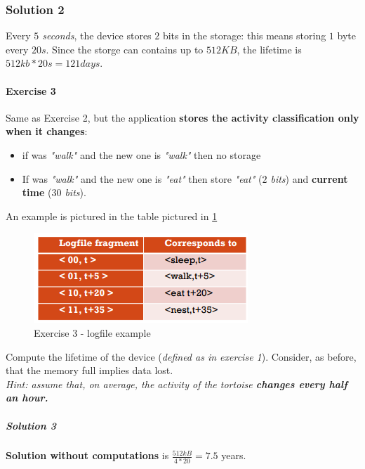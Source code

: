 \documentclass[10pt,a4paper]{report}
\theoremstyle{definition}
\begin{document}
\subsubsection{Solution 2}\label{sec:solution-2}
Every \textit{$5$ seconds}, the device stores $2$ bits in the storage: this means storing $1$ byte every $20s$. Since the storge can contains up to $512 KB$, the lifetime is $512kb*20s = 121 days$.

\paragraph{Exercise 3}\label{sec:exercise-3}
Same as Exercise 2, but the application \textbf{stores the activity classification only when it changes}:
\begin{itemize}
	\item 
	if was \textit{"walk"} and the new one is \textit{"walk"} then no storage
	\item 
	If was \textit{"walk"} and the new one is \textit{"eat"} then store \textit{"eat"} (\textit{$2$ bits}) and \textbf{current time} (\textit{$30$ bits}).
	
\end{itemize}

An example is pictured in the table pictured in \ref{tortoise-eg3}
\begin{figure}[b!]
	\centering\includegraphics[scale=0.50]{images/Pasted image 20230401160622.png}
	\caption{Exercise 3 - logfile example}
	\label{tortoise-eg3}
\end{figure}

Compute the lifetime of the device (\textit{defined as in exercise 1}). Consider, as before, that the memory full implies data lost.\\

\textit{Hint: assume that, on average, the activity of the tortoise \textbf{changes every half an hour.}}
\subparagraph{Solution 3}\label{sec:solution-3}
\textbf{Solution without computations} is $\frac{512kB}{4*20} = 7.5$ years.
\end{document}
